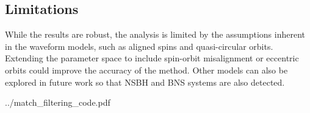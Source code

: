 \documentclass{article}
\begin{document}
\subsection{Limitations}

While the results are robust, the analysis is limited by the assumptions inherent in the waveform models, such as aligned spins and quasi-circular orbits. Extending the parameter space to include spin-orbit misalignment or eccentric orbits could improve the accuracy of the method. Other models can also be explored in future work so that NSBH and BNS systems are also detected.

\printbibliography[heading=bibintoc,title={References}]


{../match_filtering_code.pdf}
\end{document}
